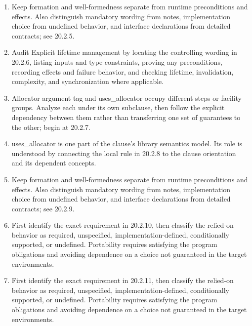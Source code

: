 \documentclass[11pt,letterpaper]{article}
\begin{document}
\begin{enumerate}
\item Keep formation and well-formedness separate from runtime preconditions and effects. Also distinguish mandatory wording from notes, implementation choice from undefined behavior, and interface declarations from detailed contracts; see 20.2.5.
\item Audit Explicit lifetime management by locating the controlling wording in 20.2.6, listing inputs and type constraints, proving any preconditions, recording effects and failure behavior, and checking lifetime, invalidation, complexity, and synchronization where applicable.
\item Allocator argument tag and uses\_\allowbreak{}allocator occupy different steps or facility groups. Analyze each under its own subclause, then follow the explicit dependency between them rather than transferring one set of guarantees to the other; begin at 20.2.7.
\item uses\_\allowbreak{}allocator is one part of the clause's library semantics model. Its role is understood by connecting the local rule in 20.2.8 to the clause orientation and its dependent concepts.
\item Keep formation and well-formedness separate from runtime preconditions and effects. Also distinguish mandatory wording from notes, implementation choice from undefined behavior, and interface declarations from detailed contracts; see 20.2.9.
\item First identify the exact requirement in 20.2.10, then classify the relied-on behavior as required, unspecified, implementation-defined, conditionally supported, or undefined. Portability requires satisfying the program obligations and avoiding dependence on a choice not guaranteed in the target environments.
\item First identify the exact requirement in 20.2.11, then classify the relied-on behavior as required, unspecified, implementation-defined, conditionally supported, or undefined. Portability requires satisfying the program obligations and avoiding dependence on a choice not guaranteed in the target environments.
\end{enumerate}
\end{document}
